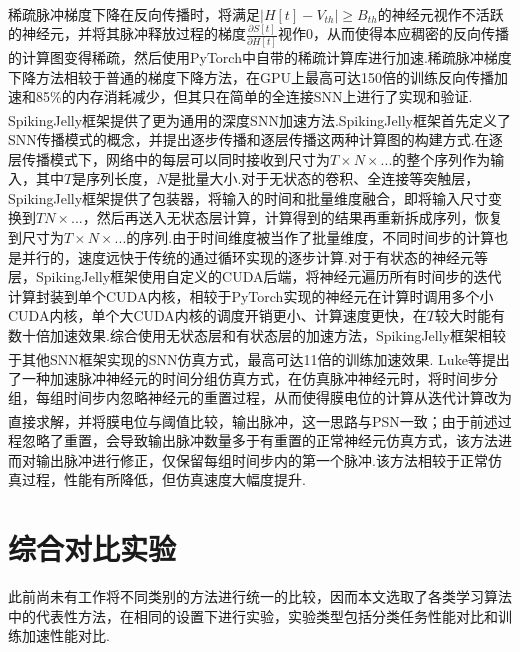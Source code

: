 \documentclass[10.5pt,compsoc,UTF8]{CjC}
\theoremstyle{mystyle}
\newcommand{\upcite}[1]{\textsuperscript{\cite{#1}}}
\begin{document}
\begin{multicols}{1}
稀疏脉冲梯度下降\upcite{perez-nieves2021sparse}在反向传播时，将满足$|H[t]-V_{th}| \ge B_{th}$的神经元视作不活跃的神经元，并将其脉冲释放过程的梯度$\frac{\partial S[t]}{\partial H[t]}$视作0，从而使得本应稠密的反向传播的计算图变得稀疏，然后使用PyTorch中自带的稀疏计算库进行加速.稀疏脉冲梯度下降方法相较于普通的梯度下降方法，在GPU上最高可达150倍的训练反向传播加速和85\%的内存消耗减少，但其只在简单的全连接SNN上进行了实现和验证.
SpikingJelly框架\upcite{doi:10.1126/sciadv.adi1480}提供了更为通用的深度SNN加速方法.SpikingJelly框架首先定义了SNN传播模式的概念，并提出逐步传播和逐层传播这两种计算图的构建方式.在逐层传播模式下，网络中的每层可以同时接收到尺寸为$T\times N \times ...$的整个序列作为输入，其中$T$是序列长度，$N$是批量大小.对于无状态的卷积、全连接等突触层，SpikingJelly框架提供了包装器，将输入的时间和批量维度融合，即将输入尺寸变换到$TN \times ...$，然后再送入无状态层计算，计算得到的结果再重新拆成序列，恢复到尺寸为$T\times N \times ...$的序列.由于时间维度被当作了批量维度，不同时间步的计算也是并行的，速度远快于传统的通过循环实现的逐步计算.对于有状态的神经元等层，SpikingJelly框架使用自定义的CUDA后端，将神经元遍历所有时间步的迭代计算封装到单个CUDA内核，相较于PyTorch实现的神经元在计算时调用多个小CUDA内核，单个大CUDA内核的调度开销更小、计算速度更快，在$T$较大时能有数十倍加速效果.综合使用无状态层和有状态层的加速方法，SpikingJelly框架相较于其他SNN框架实现的SNN仿真方式，最高可达11倍的训练加速效果.
Luke等\upcite{NEURIPS2023_b9f253c2}提出了一种加速脉冲神经元的时间分组仿真方式，在仿真脉冲神经元时，将时间步分组，每组时间步内忽略神经元的重置过程，从而使得膜电位的计算从迭代计算改为直接求解，并将膜电位与阈值比较，输出脉冲，这一思路与PSN\upcite{fang2023parallel}一致；由于前述过程忽略了重置，会导致输出脉冲数量多于有重置的正常神经元仿真方式，该方法进而对输出脉冲进行修正，仅保留每组时间步内的第一个脉冲.该方法相较于正常仿真过程，性能有所降低，但仿真速度大幅度提升.

\section{综合对比实验}
此前尚未有工作将不同类别的方法进行统一的比较，因而本文选取了各类学习算法中的代表性方法，在相同的设置下进行实验，实验类型包括分类任务性能对比和训练加速性能对比.

\end{multicols}
\end{document}
